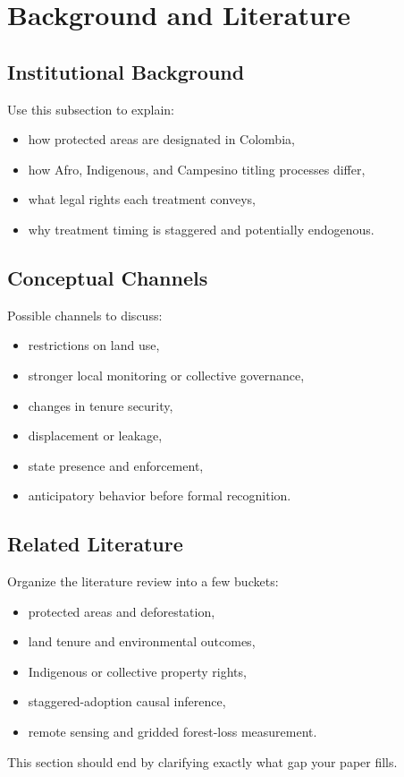 \section{Background and Literature}

\subsection{Institutional Background}

Use this subsection to explain:

\begin{itemize}
    \item how protected areas are designated in Colombia,
    \item how Afro, Indigenous, and Campesino titling processes differ,
    \item what legal rights each treatment conveys,
    \item why treatment timing is staggered and potentially endogenous.
\end{itemize}

\subsection{Conceptual Channels}

Possible channels to discuss:

\begin{itemize}
    \item restrictions on land use,
    \item stronger local monitoring or collective governance,
    \item changes in tenure security,
    \item displacement or leakage,
    \item state presence and enforcement,
    \item anticipatory behavior before formal recognition.
\end{itemize}

\subsection{Related Literature}

Organize the literature review into a few buckets:

\begin{itemize}
    \item protected areas and deforestation,
    \item land tenure and environmental outcomes,
    \item Indigenous or collective property rights,
    \item staggered-adoption causal inference,
    \item remote sensing and gridded forest-loss measurement.
\end{itemize}

This section should end by clarifying exactly what gap your paper fills.
